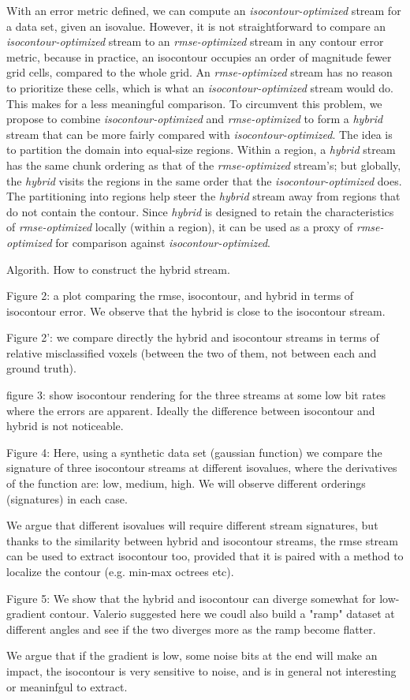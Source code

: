 With an error metric defined, we can compute an \emph{isocontour-optimized} stream for a data set,
given an isovalue. However, it is not straightforward to compare an \emph{isocontour-optimized}
stream to an \emph{rmse-optimized} stream in any contour error metric, because in practice, an
isocontour occupies an order of magnitude fewer grid cells, compared to the whole grid. An
\emph{rmse-optimized} stream has no reason to prioritize these cells, which is what an
\emph{isocontour-optimized} stream would do. This makes for a less meaningful comparison. To
circumvent this problem, we propose to combine \emph{isocontour-optimized} and \emph{rmse-optimized}
to form a \emph{hybrid} stream that can be more fairly compared with \emph{isocontour-optimized}.
The idea is to partition the domain into equal-size regions. Within a region, a \emph{hybrid} stream
has the same chunk ordering as that of the \emph{rmse-optimized} stream's; but globally, the
\emph{hybrid} visits the regions in the same order that the \emph{isocontour-optimized} does. The
partitioning into regions help steer the \emph{hybrid} stream away from regions that do not contain
the contour. Since \emph{hybrid} is designed to retain the characteristics of \emph{rmse-optimized}
locally (within a region), it can be used as a proxy of \emph{rmse-optimized} for comparison against \emph{isocontour-optimized}.

Algorith. How to construct the hybrid stream.

Figure 2: a plot comparing the rmse, isocontour, and hybrid in terms of isocontour error. We observe that the hybrid is close to the isocontour stream.

Figure 2': we compare directly the hybrid and isocontour streams in terms of relative misclassified voxels (between the two of them, not between each and ground truth).

figure 3: show isocontour rendering for the three streams at some low bit rates where the errors are apparent. Ideally the difference between isocontour and hybrid is not noticeable.

Figure 4: Here, using a synthetic data set (gaussian function) we compare the signature of three
isocontour streams at different isovalues, where the derivatives of the function are: low, medium,
high. We will observe different orderings (signatures) in each case.

We argue that different isovalues will require different stream signatures, but thanks to the
similarity between hybrid and isocontour streams, the rmse stream can be used to extract isocontour
too, provided that it is paired with a method to localize the contour (e.g. min-max octrees etc).

Figure 5: We show that the hybrid and isocontour can diverge somewhat for low-gradient contour.
Valerio suggested here we coudl also build a "ramp" dataset at different angles and see if the two
diverges more as the ramp become flatter.

We argue that if the gradient is low, some noise bits at the end will make an impact, the isocontour
is very sensitive to noise, and is in general not interesting or meaninfgul to extract.
